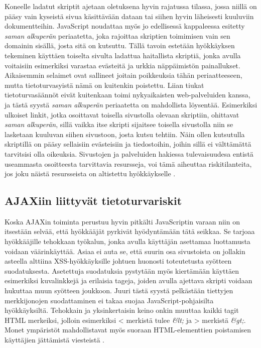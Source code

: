 Koneelle ladatut skriptit ajetaan oletuksena hyvin rajatussa tilassa, jossa niillä on pääsy vain kyseistä sivua käsittävään dataan tai siihen hyvin läheisesti kuuluviin dokumentteihin. 
JavaScript noudattaa myös jo edellisessä kappaleessa esitetty \emph{saman alkuperän} periaatetta, joka rajoittaa skriptien toimimisen vain sen domainin sisällä, josta sitä on kutsuttu.  
Tällä tavoin estetään hyökkäyksen tekeminen käyttäen toiselta sivulta ladattua haitallista skriptiä, jonka avulla voitaisiin esimerkiksi varastaa evästeitä ja urkkia näppäimistön painallukset.
Aikaisemmin selaimet ovat sallineet joitain poikkeuksia tähän periaatteeseen, mutta tietoturvasyistä nämä on kuitenkin poistettu. Liian tiukat tietoturvasäännöt eivät kuitenkaan toimi
nykyaikaisten web-palveluiden kanssa, ja tästä syystä \emph{saman alkuperän} periaatetta on mahdollista löysentää. Esimerkiksi ulkoiset linkit, jotka osoittavat toisella sivustolla olevaan
skriptiin, ohittavat \emph{saman alkuperän}, sillä vaikka itse skripti sijaitsee toisella sivustolla niin se lasketaan kuuluvan siihen sivustoon, josta kutsu tehtiin. Näin ollen 
kutsutulla skriptillä on pääsy sellaisiin evästeisiin ja tiedostoihin, joihin sillä ei välttämättä tarvitsisi olla oikeuksia. Sivustojen ja palveluiden hakiessa tulevaisuudesa
entistä useammasta osoitteesta tarvittavia resursseja, voi tämä aiheuttaa riskitilanteita, jos joku näistä resursseista on altistettu hyökkäykselle \cite{AJAX}.

\subsection{AJAXiin liittyvät tietoturvariskit}

Koska AJAXin toiminta perustuu hyvin pitkälti JavaScriptin varaan niin on itsestään selvää, että hyökkääjät pyrkivät hyödyntämään tätä seikkaa. Se tarjoaa hyökkääjille tehokkaan työkalun,
jonka avulla käyttäjän asettamaa luottamusta voidaan väärinkäyttää. Asiaa ei auta se, että suurin osa sivustoista on jollakin asteella alttiina XSS-hyökkäyksille \cite{WEB2c} johtuen huonosti
toteutetusta syötteen suodatuksesta. Asetettuja suodatuksia pystytään myös kiertämään käyttäen esimerkiksi kuvalinkkejä ja erilaisia tageja, joiden avulla ajettava skripti voidaan 
hukuttaa muun syötteen joukkoon. Juuri tästä syystä pelkästään tiettyjen merkkijonojen suodattaminen ei takaa suojaa JavaScript-pohjaisilta hyökkäyksiltä. Tehokkain ja yksinkertaisin keino
onkin muuttaa kaikki tagit HTML merkeiksi, jolloin esimerkiksi < merkistä tulee \emph{&lt;} ja > merkistä \emph{&gt;}. Monet ympäristöt mahdollistavat myös suoraan HTML-elementtien
poistamisen käyttäjien jättämistä viesteistä \cite{AJAX}.

